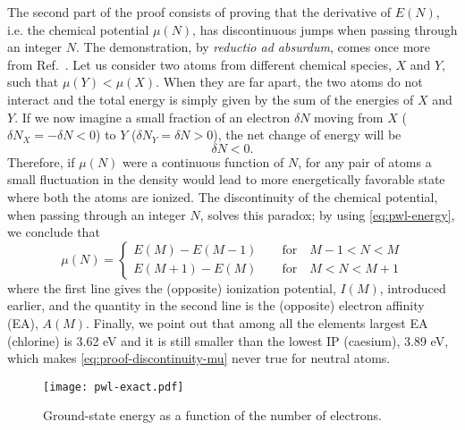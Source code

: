 The second part of the proof consists of proving that the derivative of $E(N)$, i.e. the chemical potential $\mu(N)$, has discontinuous jumps when passing through an integer $N$. The demonstration, by \emph{reductio ad absurdum}, comes once more from Ref.~\cite{perdew_density-functional_1982}. Let us consider two atoms from different chemical species, $X$ and $Y$, such that $\mu(Y)<\mu(X)$. When they are far apart, the two atoms do not interact and the total energy is simply given by the sum of the energies of $X$ and $Y$. If we now imagine a small fraction of an electron $\delta N$ moving from $X$ ($\delta N_X = - \delta N < 0$) to $Y$ ($\delta N_Y = \delta N > 0$), the net change of energy will be
%
\begin{equation}
    [\mu(Y) - \mu(X)] \delta N < 0 .
    \label{eq:proof-discontinuity-mu}
\end{equation}
%
Therefore, if $\mu(N)$ were a continuous function of $N$, for any pair of atoms a small fluctuation in the density would lead to more energetically favorable state where both the atoms are ionized. The discontinuity of the chemical potential, when passing through an integer $N$, solves this paradox; by using \cref{eq:pwl-energy}, we conclude that
%
\begin{equation}
    \mu(N) =
    \begin{cases}
        E(M) - E(M-1) \qquad \text{for} \quad M-1<N<M \\
        E(M+1) - E(M) \qquad \text{for} \quad M<N<M+1
    \end{cases}
    \label{eq:mu-ip-ea}
\end{equation}
%
where the first line gives the (opposite) ionization potential, $I(M)$, introduced earlier, and the quantity in the second line is the (opposite) electron affinity (EA), $A(M)$. Finally, we point out that among all the elements largest EA (chlorine) is 3.62 eV and it is still smaller than the lowest IP (caesium), 3.89 eV, which makes \cref{eq:proof-discontinuity-mu} never true for neutral atoms.
%
\begin{figure}
    \centering
    \texttt{[image: pwl-exact.pdf]}
    \caption{Ground-state energy as a function of the number of electrons.}
    \label{fig:pwl}
\end{figure}

